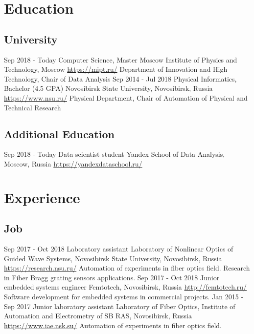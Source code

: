 \documentclass[11pt,a4paper]{moderncv}
\begin{document}
\maketitle

\section{Education}
  \subsection{University}
  \cventry
    {Sep 2018 - Today}
    {Computer Science, Master}
    {Moscow Institute of Physics and Technology, Moscow}
    {\newline\url{https://mipt.ru/}}{}
    {Department of Innovation and High Technology, Chair of Data Analysis}
  \cventry
    {Sep 2014 - Jul 2018}
    {Physical Informatics, Bachelor (4.5 GPA)}
    {Novosibirsk State University, Novosibirsk, Russia}
    {\newline\url{https://www.nsu.ru/}}{}
    {Physical Department, Chair of Automation of Physical and Technical Research}
  \subsection{Additional Education}
  \cventry
    {Sep 2018 - Today}
    {Data scientist student}
    {Yandex School of Data Analysis, Moscow, Russia}
    {}{\newline\url{https://yandexdataschool.ru/}}{}

\section{Experience}
\subsection{Job}
\cventry
  {Sep 2017 - Oct 2018}
  {Laboratory assistant}
  {Laboratory of Nonlinear Optics of Guided Wave Systems, \newline{}
  Novosibirsk State University, Novosibirsk, Russia}
  {\newline{}\url{https://research.nsu.ru/}}{}
  {Automation of experiments in fiber optics field. Research in Fiber Bragg grating sensors applications.}
\cventry
  {Sep 2017 - Oct 2018}
  {Junior embedded systems engineer}
  {Femtotech, Novosibirsk, Russia}
  {\newline{}\url{http://femtotech.ru/}}{}
  {Software development for embedded systems in commercial projects.}
\cventry
  {Jan 2015 - Sep 2017}
  {Junior laboratory assistant}
  {Laboratory of Fiber Optics, \newline{}
  Institute of Automation and Electrometry of SB RAS, Novosibirsk, Russia}
  {\newline{}\url{https://www.iae.nsk.su/}}{}
  {Automation of experiments in fiber optics field.}
\end{document}
